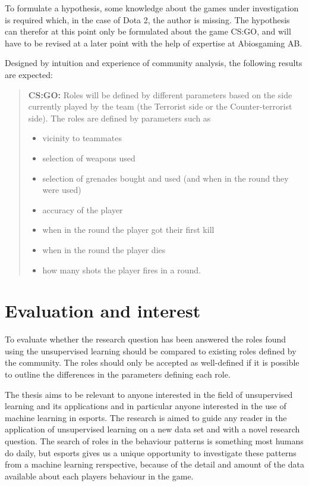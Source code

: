 \documentclass{article}
\begin{document}
To formulate a hypothesis, some knowledge about the games under investigation is required which, in the case of Dota 2, the author is missing. The hypothesis can therefor at this point only be formulated about the game CS:GO, and will have to be revised at a later point with the help of expertise at Abiosgaming AB.

Designed by intuition and experience of community analysis, the following results are expected:
\begin{quote}
    {\bf CS:GO:} Roles will be defined by different parameters based on the side currently played by the team (the Terrorist side or the Counter-terrorist side). The roles are defined by parameters such as
    \begin{itemize}
        \item vicinity to teammates
        \item selection of weapons used
        \item selection of grenades bought and used (and when in the round they were used)
        \item accuracy of the player
        \item when in the round the player got their first kill
        \item when in the round the player dies
        \item how many shots the player fires in a round.
    \end{itemize}
\end{quote}

\section{Evaluation and interest}
To evaluate whether the research question has been answered the roles found using the unsupervised learning should be compared to existing roles defined by the community. The roles should only be accepted as well-defined if it is possible to outline the differences in the parameters defining each role.

The thesis aims to be relevant to anyone interested in the field of unsupervised learning and its applications and in particular anyone interested in the use of machine learning in esports. The research is aimed to guide any reader in the application of unsupervised learning on a new data set and with a novel research question. The search of roles in the behaviour patterns is something most humans do daily, but esports gives us a unique opportunity to investigate these patterns from a machine learning rerspective, because of the detail and amount of the data available about each players behaviour in the game.
\end{document}
